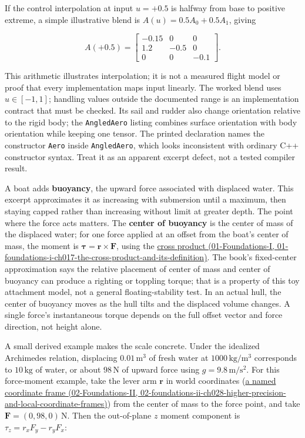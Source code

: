 If the control interpolation at input \(u=+0.5\) is halfway from base to positive extreme, a simple illustrative blend is \(A(u)=0.5A_0+0.5A_1\), giving

\[
A(+0.5)=\begin{bmatrix}-0.15&0&0\\1.2&-0.5&0\\0&0&-0.1\end{bmatrix}.
\]

This arithmetic illustrates interpolation; it is not a measured flight model or proof that every implementation maps input linearly. The worked blend uses \(u\in[-1,1]\); handling values outside the documented range is an implementation contract that must be checked. Its sail and rudder also change orientation relative to the rigid body; the \texttt{AngledAero} listing combines surface orientation with body orientation while keeping one tensor. The printed declaration names the constructor \texttt{Aero} inside \texttt{AngledAero}, which looks inconsistent with ordinary C++ constructor syntax. Treat it as an apparent excerpt defect, not a tested compiler result.

A boat adds \textbf{buoyancy}, the upward force associated with displaced water. This excerpt approximates it as increasing with submersion until a maximum, then staying capped rather than increasing without limit at greater depth. The point where the force acts matters. The \textbf{center of buoyancy} is the center of mass of the displaced water; for one force applied at an offset from the boat's center of mass, the moment is \(\boldsymbol{\tau}=\mathbf{r}\times\mathbf{F}\), using the \href{../01-Foundations-I/main.pdf\#nameddest=01-foundations-i-ch017-the-cross-product-and-its-definition}{cross product (01-Foundations-I, 01-foundations-i-ch017-the-cross-product-and-its-definition)}. The book's fixed-center approximation says the relative placement of center of mass and center of buoyancy can produce a righting or toppling torque; that is a property of this toy attachment model, not a general floating-stability test. In an actual hull, the center of buoyancy moves as the hull tilts and the displaced volume changes. A single force's instantaneous torque depends on the full offset vector and force direction, not height alone.

A small derived example makes the scale concrete. Under the idealized Archimedes relation, displacing \(0.01\,\mathrm{m^3}\) of fresh water at \(1000\,\mathrm{kg/m^3}\) corresponds to \(10\,\mathrm{kg}\) of water, or about \(98\,\mathrm{N}\) of upward force using \(g=9.8\,\mathrm{m/s^2}\). For this force-moment example, take the lever arm \(\mathbf r\) in world coordinates (\href{../02-Foundations-II/main.pdf\#nameddest=02-foundations-ii-ch028-higher-precision-and-local-coordinate-frames}{a named coordinate frame (02-Foundations-II, 02-foundations-ii-ch028-higher-precision-and-local-coordinate-frames)}) from the center of mass to the force point, and take \(\mathbf F=(0,98,0)\,\mathrm{N}\). Then the out-of-plane \(z\) moment component is \(\tau_z=r_xF_y-r_yF_x\):

